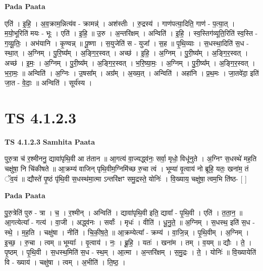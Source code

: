 \documentclass[17pt]{extarticle}
\begin{document}
\textbf{Pada Paata} \newline

एति॑ । इ॒हि॒ । अ॒व॒क्राम॒न्नित्य॑व - क्रामन्न्॑ । अश॑स्तीः । रु॒द्रस्य॑ । गाण॑पत्या॒दिति॒ गाण॑ - प॒त्या॒त् । म॒यो॒भूरिति॑ मयः - भूः । एति॑ । इ॒हि॒ ॥ उ॒रु । अ॒न्तरि॑क्षम् । अन्विति॑ । इ॒हि॒ । स्व॒स्तिग॑व्यूति॒रिति॑ स्व॒स्ति - ग॒व्यू॒तिः॒ । अभ॑यानि । कृ॒ण्वन्न् ॥ पू॒ष्णा । स॒युजेति॑ स - युजा᳚ । स॒ह ॥ पृ॒थि॒व्याः । स॒धस्था॒दिति॑ स॒ध - स्था॒त् । अ॒ग्निम् । पु॒रि॒ष्य᳚म् । अ॒ङ्गि॒र॒स्वत् । अच्छ॑ । इ॒हि॒ । अ॒ग्निम् । पु॒री॒ष्य᳚म् । अ॒ङ्गि॒र॒स्वत् । अच्छ॑ । इ॒मः॒ । अ॒ग्निम् । पु॒री॒ष्य᳚म् । अ॒ङ्गि॒र॒स्वत् । भ॒रि॒ष्या॒मः॒ । अ॒ग्निम् । पु॒री॒ष्य᳚म् । अ॒ङ्गि॒र॒स्वत् । भ॒रा॒मः॒ ॥ अन्विति॑ । अ॒ग्निः । उ॒षसा᳚म् । अग्र᳚म् । अ॒ख्य॒त् । अन्विति॑ । अहा॑नि । प्र॒थ॒मः । जा॒तवे॑दा॒ इति॑ जा॒त - वे॒दाः॒ ॥ अन्विति॑ । सूर्य॑स्य ।  \newline




\section*{ TS 4.1.2.3 }

\textbf{TS 4.1.2.3 } \newline
\textbf{Samhita Paata} \newline

पुरु॒त्रा च॑ र॒श्मीननु॒ द्यावा॑पृथि॒वी आ त॑तान ॥ आ॒गत्य॑ वा॒ज्यद्ध्व॑नः॒ सर्वा॒ मृधो॒ विधू॑नुते । अ॒ग्निꣳ स॒धस्थे॑ मह॒ति चक्षु॑षा॒ नि चि॑कीषते ॥ आ॒क्रम्य॑ वाजिन् पृथि॒वीम॒ग्निमि॑च्छ रु॒चा त्वं । भूम्या॑ वृ॒त्वाय॑ नो ब्रूहि॒ यतः॒ खना॑म॒ तं ॅव॒यं ॥ द्यौस्ते॑ पृ॒ष्ठं पृ॑थि॒वी स॒धस्थ॑मा॒त्मा ऽन्तरि॑क्षꣳ समु॒द्रस्ते॒ योनिः॑ । वि॒ख्याय॒ चक्षु॑षा॒ त्वम॒भि ति॑ष्ठ- [  ] \newline

\textbf{Pada Paata} \newline

पु॒रु॒त्रेति॑ पुरु - त्रा । च॒ । र॒श्मीन् । अन्विति॑ । द्यावा॑पृथि॒वी इति॒ द्यावा᳚ - पृ॒थि॒वी । एति॑ । त॒ता॒न॒ ॥ आ॒गत्येत्या᳚ - गत्य॑ । वा॒जी । अद्ध्व॑नः । सर्वाः᳚ । मृधः॑ । वीति॑ । धू॒नु॒ते॒ ॥ अ॒ग्निम् । स॒धस्थ॒ इति॑ स॒ध - स्थे॒ । म॒ह॒ति । चक्षु॑षा । नीति॑ । चि॒की॒ष॒ते॒ ॥ आ॒क्रम्येत्या᳚ - क्रम्य॑ । वा॒जि॒न्न् । पृ॒थि॒वीम् । अ॒ग्निम् । इ॒च्छ॒ । रु॒चा । त्वम् ॥ भूम्याः᳚ । वृ॒त्वाय॑ । नः॒ । ब्रू॒हि॒ । यतः॑ । खना॑म । तम् । व॒यम् ॥ द्यौः । ते॒ । पृ॒ष्ठम् । पृ॒थि॒वी । स॒धस्थ॒मिति॑ स॒ध - स्थ॒म् । आ॒त्मा । अ॒न्तरि॑क्षम् । स॒मु॒द्रः । ते॒ । योनिः॑ ॥ वि॒ख्यायेति॑ वि - ख्याय॑ । चक्षु॑षा । त्वम् । अ॒भीति॑ । ति॒ष्ठ॒ ।  \newline
\end{document}
